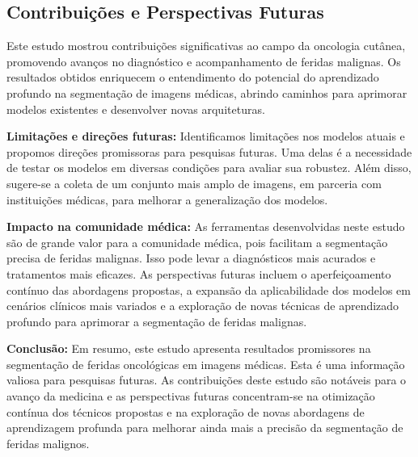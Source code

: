 \subsection{Contribuições e Perspectivas Futuras}

    Este estudo mostrou contribuições significativas ao campo da oncologia cutânea, promovendo avanços no diagnóstico e acompanhamento de feridas malignas. Os resultados obtidos enriquecem o entendimento do potencial do aprendizado profundo na segmentação de imagens médicas, abrindo caminhos para aprimorar modelos existentes e desenvolver novas arquiteturas.

    \textbf{Limitações e direções futuras:} Identificamos limitações nos modelos atuais e propomos direções promissoras para pesquisas futuras. Uma delas é a necessidade de testar os modelos em diversas condições para avaliar sua robustez. Além disso, sugere-se a coleta de um conjunto mais amplo de imagens, em parceria com instituições médicas, para melhorar a generalização dos modelos.

    \textbf{Impacto na comunidade médica:} As ferramentas desenvolvidas neste estudo são de grande valor para a comunidade médica, pois facilitam a segmentação precisa de feridas malignas. Isso pode levar a diagnósticos mais acurados e tratamentos mais eficazes. As perspectivas futuras incluem o aperfeiçoamento contínuo das abordagens propostas, a expansão da aplicabilidade dos modelos em cenários clínicos mais variados e a exploração de novas técnicas de aprendizado profundo para aprimorar a segmentação de feridas malignas.

    \textbf{Conclusão:} Em resumo, este estudo apresenta resultados promissores na segmentação de feridas oncológicas em imagens médicas. Esta é uma informação valiosa para pesquisas futuras. As contribuições deste estudo são notáveis para o avanço da medicina e as perspectivas futuras concentram-se na otimização contínua dos técnicos propostas e na exploração de novas abordagens de aprendizagem profunda para melhorar ainda mais a precisão da segmentação de feridas malignos.